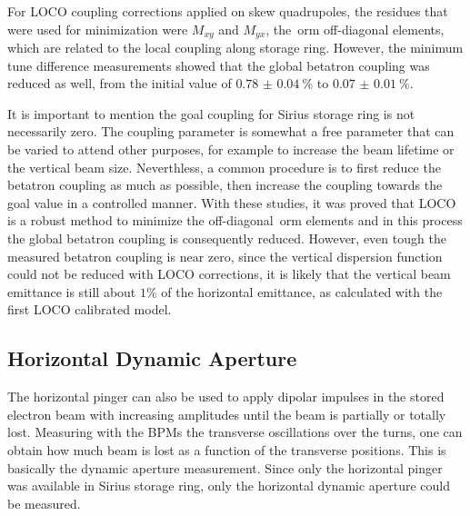 For LOCO coupling corrections applied on skew quadrupoles, the residues that were used for minimization were $M_{xy}$ and $M_{yx}$, the~\gls{orm} off-diagonal elements, which are related to the local coupling along storage ring. However, the minimum tune difference measurements showed that the global betatron coupling was reduced as well, from the initial value of $\SI{0.78(4)}{\%}$ to $\SI{0.07(1)}{\%}$.

It is important to mention the goal coupling for Sirius storage ring is not necessarily zero. The coupling parameter is somewhat a free parameter that can be varied to attend other purposes, for example to increase the beam lifetime or the vertical beam size. Neverthless, a common procedure is to first reduce the betatron coupling as much as possible, then increase the coupling towards the goal value in a controlled manner. With these studies, it was proved that LOCO is a robust method to minimize the off-diagonal~\gls{orm} elements and in this process the global betatron coupling is consequently reduced. However, even tough the measured betatron coupling is near zero, since the vertical dispersion function could not be reduced with LOCO corrections, it is likely that the vertical beam emittance is still about $1\%$ of the horizontal emittance, as calculated with the first LOCO calibrated model.

\subsection{Horizontal Dynamic Aperture}
The horizontal pinger can also be used to apply dipolar impulses in the stored electron beam with increasing amplitudes until the beam is partially or totally lost. Measuring with the BPMs the transverse oscillations over the turns, one can obtain how much beam is lost as a function of the transverse positions. This is basically the dynamic aperture measurement. Since only the horizontal pinger was available in Sirius storage ring, only the horizontal dynamic aperture could be measured.


